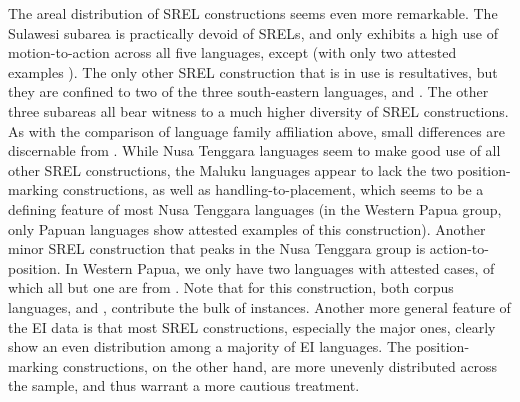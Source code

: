 The areal distribution of SREL constructions seems even more remarkable. The Sulawesi subarea is practically devoid of SRELs, and only exhibits a high use of motion-to-action across all five languages, except  (with only two attested examples%
). The only other SREL construction that is in use is resultatives, but they are confined to two of the three south-eastern languages,  and . The other three subareas all bear witness to a much higher diversity of SREL constructions. As with the comparison of language family affiliation above, small differences are discernable from . While Nusa Tenggara languages seem to make good use of all other SREL constructions, the Maluku languages appear to lack the two position-marking constructions, as well as handling-to-placement, which seems to be a defining feature of most Nusa Tenggara languages (in the Western Papua group, only Papuan languages show attested examples of this construction). Another minor SREL construction that peaks in the Nusa Tenggara group is action-to-position. In Western Papua, we only have two languages with attested cases, of which all but one are from . Note that for this construction, both corpus languages,  and , contribute the bulk of instances. Another more general feature of the EI data %
is that most SREL constructions, especially the major ones, clearly show an even distribution among a majority of EI languages. The position-marking constructions, on the other hand, are more unevenly distributed across the sample, and thus warrant a more cautious treatment.

